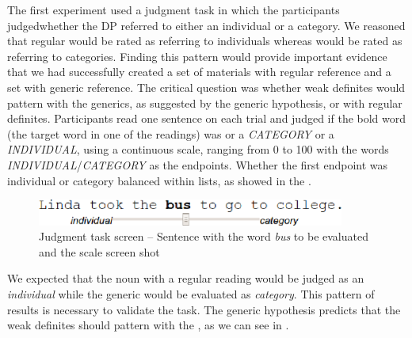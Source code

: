 \documentclass[output=paper,
modfonts
]{langscibook}
\begin{document}
The first experiment used a judgment task in which the participants judged\linebreak whether the DP referred to either an individual or a category. We reasoned that regular  would be rated as referring to individuals whereas  would be rated as referring to categories. Finding this pattern would provide important evidence that we had successfully created a set of materials with regular reference and a set with generic reference. The critical question was whether weak definites would pattern with the generics, as suggested by the generic hypothesis, or with regular definites. Participants read one sentence on each trial and judged if the bold word (the target word in one of the readings) was or a \textit{CATEGORY} or a \textit{INDIVIDUAL}, using a continuous scale, ranging from 0 to 100 with the words \textit{INDIVIDUAL}/\textit{CATEGORY} as the endpoints. Whether the first endpoint was individual or category balanced within lists, as showed in the .

\begin{figure}[H]
\centering
\includegraphics[width=0.9\textwidth]{figures/fig_jpinput}
\caption{Judgment task screen -- Sentence with the word \textit{bus} to be evaluated and the scale screen shot}
\label{fig:desaetal:3}
\end{figure}

We expected that the noun with a regular reading would be judged as an \textit{individual} while the generic would be evaluated as \textit{category}. This pattern of results is necessary to validate the task. The generic hypothesis predicts that the weak definites should pattern with the , as we can see in .
\end{document}
